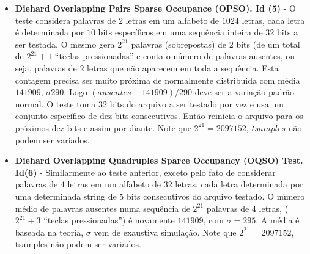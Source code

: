 \begin{itemize}
   \item \textbf{Diehard Overlapping Pairs Sparse Occupance (OPSO). Id (5)} - O teste considera palavras de $2$ letras em um alfabeto de $1024$ letras, cada letra é determinada por $10$ bits específicos em uma sequência inteira de $32$ bits a ser testada. O mesmo gera $2^{21}$ palavras (sobrepostas) de $2$ bits (de um total de $2^{21}+1$ ``teclas pressionadas'' e conta o número de palavras ausentes, ou seja, palavras de $2$ letras que não aparecem em toda a sequência. Esta contagem precisa ser muito próxima de normalmente distribuida com média $141909$, $\sigma 290$. Logo $(ausentes-141909)/290$ deve ser a variação padrão normal. O teste toma 32 bits do arquivo a ser testado por vez e usa um conjunto específico de dez bits consecutivos. Então reinicia o arquivo para os próximos dez bits e assim por diante. Note que $2^{21}=2097152$, $tsamples$ não podem ser variados.
   
   \item \textbf{Diehard Overlapping Quadruples Sparce Occupancy (OQSO) Test. Id(6)} - Similarmente ao teste anterior, exceto pelo fato de considerar palavras de $4$ letras em um alfabeto de 32 letras, cada letra determinada por uma determinada string de $5$ bits consecutivos do arquivo testado. O número médio de palavras ausentes numa sequência de $2^{21}$ palavras de $4$ letras, ($2^{21}+3$ ``teclas pressionadas'') é novamente $141909$, com $\sigma=295$. A média é baseada na teoria, $\sigma$ vem de exaustiva simulação. Note que $2^{21}=2097152$, tsamples não podem ser variados.
   

\end{itemize}
